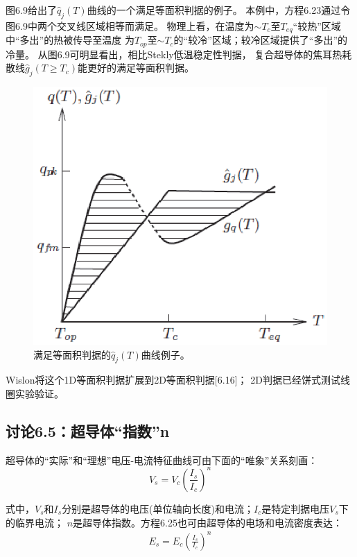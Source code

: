 图6.9给出了$\hat{q}_j(T)$曲线的一个满足等面积判据的例子。
本例中，方程6.23通过令图6.9中两个交叉线区域相等而满足。
物理上看，在温度为$\sim T_c$至$T_{eq}$“较热”区域中“多出”的热被传导至温度
为$T_{op}$至$\sim T_{c}$的“较冷”区域；较冷区域提供了“多出”的冷量。
从图6.9可明显看出，相比Stekly低温稳定性判据，
复合超导体的焦耳热耗散线$\hat{g}_j(T\ge T_c)$能更好的满足等面积判据。
\begin{figure}[htbp]
	\centering
	\includegraphics[scale=0.7]{chpt6/figs/fig6.9.eps}
	\caption{满足等面积判据的$\hat{q}_j(T)$曲线例子。}
\end{figure}

Wislon将这个1D等面积判据扩展到2D等面积判据[6.16]；
2D判据已经饼式测试线圈实验验证。

\subsection{讨论6.5：超导体“指数”n}
超导体的“实际”和“理想”电压-电流特征曲线可由下面的“唯象”关系刻画：
\begin{equation}%
V_s=V_c(\frac{I_s}{I_c})^n
\end{equation}

式中，$V_s$和$I_s$分别是超导体的电压(单位轴向长度)和电流；$I_c$是特定判据电压$V_s$下的临界电流；
$n$是超导体指数。方程6.25也可由超导体的电场和电流密度表达：
\begin{align*}%
E_s=E_c(\frac{I_s}{I_c})^n \tag{6.25'}
\end{align*}

